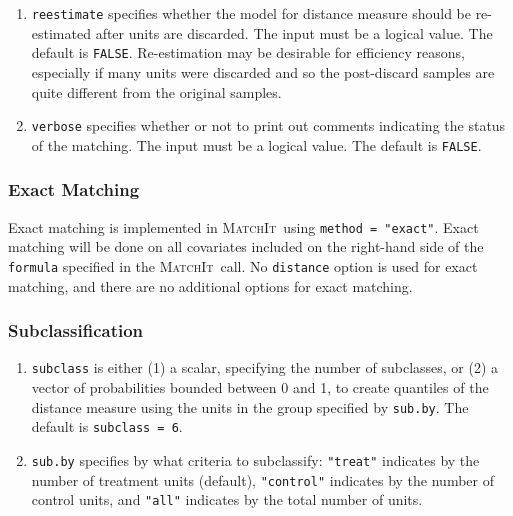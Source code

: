 \documentclass[oneside,letterpaper,titlepage]{article}
\newcommand{\MatchIt}{\textsc{MatchIt}}
\begin{document}
\begin{enumerate}
\item \texttt{reestimate} specifies whether the model for distance
  measure should be re-estimated after units are discarded. The input
  must be a logical value. The default is \texttt{FALSE}.
  Re-estimation may be desirable for efficiency reasons, especially if
  many units were discarded and so the post-discard samples are quite
  different from the original samples.

\item \texttt{verbose} specifies whether or not to print out comments
  indicating the status of the matching. The input must be a logical
  value. The default is \texttt{FALSE}.
\end{enumerate}

\subsubsection{Exact Matching}

Exact matching is implemented in \MatchIt\ using \texttt{method =
  "exact"}.  Exact matching will be done on all covariates included on
the right-hand side of the \texttt{formula} specified in the \MatchIt\
call.  No \texttt{distance} option is used for exact matching, and
there are no additional options for exact matching.

\subsubsection{Subclassification}

\begin{enumerate}
\item \texttt{subclass} is either (1) a scalar, specifying the number
  of subclasses, or (2) a vector of probabilities bounded between 0
  and 1, to create quantiles of the distance measure using the units
  in the group specified by \texttt{sub.by}.  The default is
  \texttt{subclass = 6}.
\item \texttt{sub.by} specifies by what criteria to subclassify:
  \texttt{"treat"} indicates by the number of treatment units
  (default), \texttt{"control"} indicates by the number of control
  units, and \texttt{"all"} indicates by the total number of units.
\end{enumerate}
\end{document}
